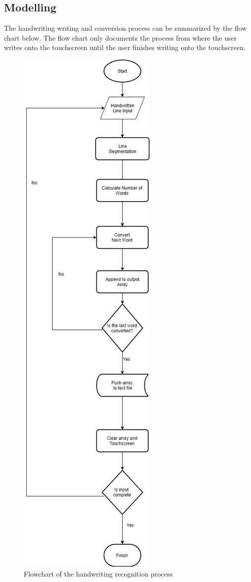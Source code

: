 \subsection{Modelling}

The handwriting writing and conversion process can be summarized by the flow chart below. The flow chart only documents the process from where the user writes onto the touchscreen until the user finishes writing onto the touchscreen.
\clearpage
\begin{figure}
	\centering
	\includegraphics[scale=0.5]{34}
	\caption{Flowchart of the handwriting recognition process}
\end{figure}
\clearpage

